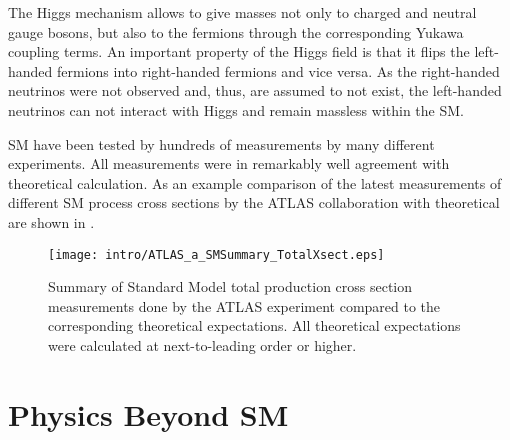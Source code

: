 The Higgs mechanism allows to give masses not only to charged and neutral gauge bosons, but also to the fermions through the corresponding Yukawa coupling terms. An important property of the Higgs field is that it flips the left-handed fermions into right-handed fermions and vice versa. 
As the right-handed neutrinos were not observed and, thus, are assumed to not exist, the left-handed
neutrinos can not interact with Higgs and remain massless within the SM.

SM have been tested by hundreds of measurements by many different experiments.
All measurements were in remarkably well agreement with theoretical calculation.
As an example comparison of the latest measurements of different SM process cross sections by the ATLAS collaboration with theoretical are shown in
.

\begin{figure}[]
  \centering
  \texttt{[image: intro/ATLAS\_a\_SMSummary\_TotalXsect.eps]}
  \caption{
  Summary of Standard Model total production cross section measurements done by the ATLAS experiment compared to the corresponding theoretical expectations. 
  All theoretical expectations were calculated at next-to-leading order or higher. 
  }
  \label{fig:SM_theory_vs_data}
\end{figure}








\section{Physics Beyond SM}

